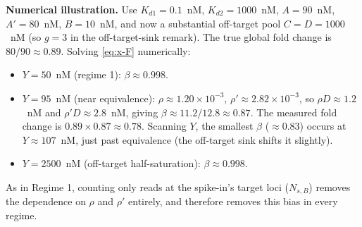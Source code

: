 \textbf{Numerical illustration.} Use $K_{d1}=0.1$~nM, $K_{d2}=1000$~nM,
$A=90$~nM, $A'=80$~nM, $B=10$~nM, and now a substantial off-target pool
$C=D=1000$~nM (so $g=3$ in the off-target-sink remark). The true global fold
change is $80/90\approx0.89$. Solving \eqref{eq:x-F} numerically:
\begin{itemize}
    \item $Y=50$~nM (regime 1): $\beta\approx0.998$.
    \item $Y=95$~nM (near equivalence): $\rho\approx1.20\times10^{-3}$,
    $\rho'\approx2.82\times10^{-3}$, so $\rho D\approx1.2$~nM and
    $\rho'D\approx2.8$~nM, giving $\beta\approx11.2/12.8\approx0.87$. The
    measured fold change is $0.89\times0.87\approx0.78$. Scanning $Y$, the
    smallest $\beta$ ($\approx0.83$) occurs at $Y\approx107$~nM, just past
    equivalence (the off-target sink shifts it slightly).
    \item $Y=2500$~nM (off-target half-saturation): $\beta\approx0.998$.
\end{itemize}
As in Regime 1, counting only reads at the spike-in's target loci
($N_{s,B}$) removes the dependence on $\rho$ and $\rho'$ entirely, and
therefore removes this bias in every regime.
